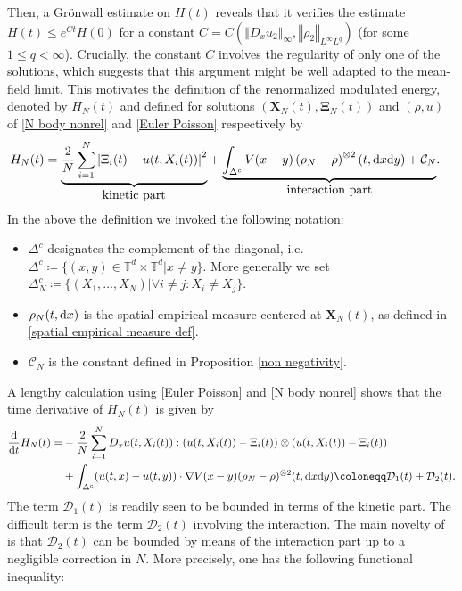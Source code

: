 \documentclass[11pt,reqno]{amsart}
\numberwithin{equation}{section}
\def\dd{{\rm d}}
\begin{document}
Then, a Gr\"onwall estimate on $H(t)$ reveals that it verifies the estimate $H(t)\leq e^{Ct}H(0)$ for a constant $C=C(\left\Vert D_{x}u_{2}\right\Vert_{\infty},\left\Vert \rho_{2}\right\Vert_{L^{\infty} L^{q}})$ (for some $1\leq q<\infty$). Crucially,  the constant $C$ involves the regularity of only one of the solutions, which suggests that this argument might be well adapted to the mean-field limit. This motivates the definition of the renormalized modulated energy, denoted by $H_{N}(t)$ and defined for solutions $(\mathbf{X}_{N}(t),\mathbf{\Xi}_{N}(t))$ and $(\rho,u)$ of \eqref{N body nonrel} and \eqref{Euler Poisson} respectively by 
\begin{align}
H_{N}(t)&=\underset{\mbox{kinetic part}}{\underbrace{\frac{2}{N}\sum_{i=1}^{N}\left\vert \Xi_{i}(t)-u(t,X_{i}(t))\right\vert^{2}}}+\underset{\mbox{interaction part}}{\underbrace{\int_{\Delta^{c}}V(x-y)\left(\rho_{N}-\rho\right)^{\otimes 2}(t,\dd x\dd y)+\mathcal{C}_{N}}}. \label{nonrel renormalized modulated energy}
\end{align}
In the above the definition we invoked the following notation: 
\begin{itemize}
    \item $\Delta^{c}$  designates the complement of the diagonal, i.e. $\Delta^{c}\coloneqq\{(x,y)\in \mathbb{T}^{d}\times \mathbb{T}^{d}\vert x\neq y\}$. More generally we set $\Delta_{N}^{c}\coloneqq \{(X_{1},\dots,X_{N})\vert \forall i\neq j: X_{i}\neq X_{j}\}$.
    \item $\rho_{N}(t,\dd x)$ is the spatial empirical measure centered at $\mathbf{X}_{N}(t)$, as defined in \eqref{spatial empirical measure def}. 
    \item $\mathcal{C}_{N}$ is the constant defined in Proposition \ref{non negativity}.
\end{itemize}
A lengthy calculation using \eqref{Euler Poisson} and \eqref{N body nonrel} shows that the time derivative of $H_{N}(t)$ is given by 
\begin{align*}
\frac{\dd}{\dd t}H_{N}(t)=&-\frac{2}{N}\sum_{i=1}^{N}D_{x}u(t,X_{i}(t)):(u(t,X_{i}(t))-\Xi_{i}(t))\otimes (u(t,X_{i}(t))-\Xi_{i}(t))\\
&+\int_{\Delta^{c}}(u(t,x)-u(t,y))\cdot \nabla V(x-y)(\rho_{N}-\rho)^{\otimes 2}(t,\dd x\dd y)\coloneqq\mathcal{D}_{1}(t)+\mathcal{D}_{2}(t).
\end{align*}
The term $\mathcal{D}_{1}(t)$ is readily seen to be bounded in terms of the kinetic part. The difficult term is the term $\mathcal
{D}_{2}(t)$ involving the interaction. The main novelty of \cite{duerinckx2020mean} is that $\mathcal{D}_{2}(t)$ can be bounded by means of the interaction part up to a negligible correction in $N$. More precisely, one has the following functional inequality:  
\end{document}
